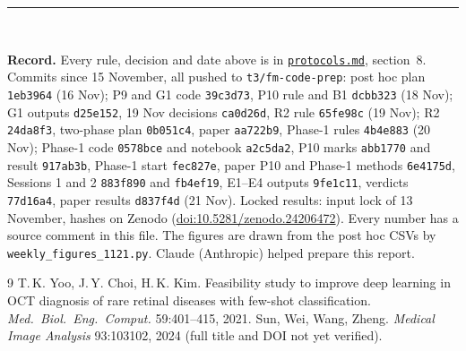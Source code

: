 \documentclass[10pt,a4paper]{article}
\newcommand{\file}[1]{\texttt{\small #1}}
\newcommand{\hash}[1]{\texttt{\footnotesize #1}}
\begin{document}
\medskip
\noindent\rule{\linewidth}{0.4pt}\\
{\footnotesize \textbf{Record.} Every rule, decision and date above is in
\href{https://github.com/Malnoad/Few-shot-rare-diseases/blob/t3/fm-code-prep/protocols.md}{\file{protocols.md}},
section~8. Commits since 15 November, all pushed to \file{t3/fm-code-prep}: post hoc plan \hash{1eb3964}
(16 Nov); P9 and G1 code \hash{39c3d73}, P10 rule and B1 \hash{dcbb323} (18 Nov); G1 outputs \hash{d25e152},
19 Nov decisions \hash{ca0d26d}, R2 rule \hash{65fe98c} (19 Nov); R2 \hash{24da8f3}, two-phase plan
\hash{0b051c4}, paper \hash{aa722b9}, Phase-1 rules \hash{4b4e883} (20 Nov); Phase-1 code \hash{0578bce} and
notebook \hash{a2c5da2}, P10 marks \hash{abb1770} and result \hash{917ab3b}, Phase-1 start \hash{fec827e},
paper P10 and Phase-1 methods \hash{6e4175d}, Sessions 1 and 2 \hash{883f890} and \hash{fb4ef19}, E1--E4 outputs
\hash{9fe1c11}, verdicts \hash{77d16a4}, paper results \hash{d837f4d} (21 Nov). Locked results: input lock of 13 November, hashes on Zenodo
(\href{https://doi.org/10.5281/zenodo.24206472}{doi:10.5281/zenodo.24206472}). Every number has a source
comment in this file. The figures are drawn from the post hoc CSVs by \file{weekly\_figures\_1121.py}. Claude
(Anthropic) helped prepare this report.\par}

\begin{thebibliography}{9}
 T.\,K. Yoo, J.\,Y. Choi, H.\,K. Kim. Feasibility study to improve deep learning in OCT
diagnosis of rare retinal diseases with few-shot classification. \emph{Med.\ Biol.\ Eng.\ Comput.}
59:401--415, 2021.
 Sun, Wei, Wang, Zheng. \emph{Medical Image Analysis} 93:103102, 2024 (full title and DOI
not yet verified).
\end{thebibliography}
\end{document}

